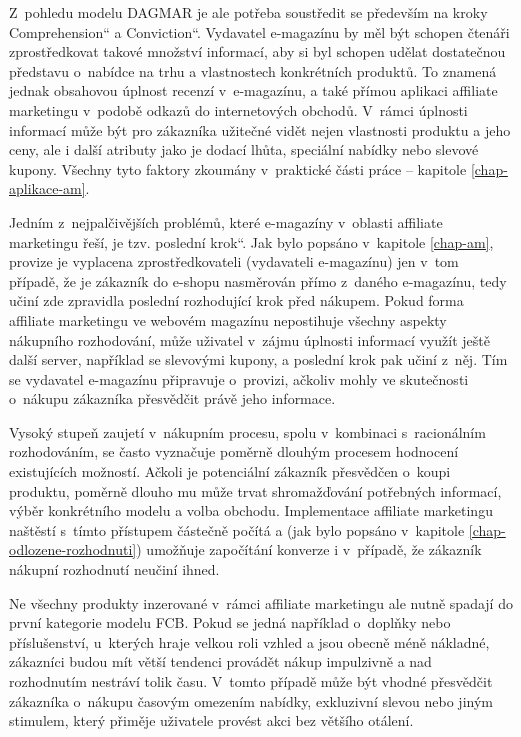 \documentclass[12pt,oneside,openany]{fithesis}
\begin{document}
Z~pohledu modelu DAGMAR je ale potřeba soustředit se především na kroky 
\glqq Comprehension\textquotedblleft{} a \glqq Conviction\textquotedblleft{}. 
Vydavatel e-magazínu by měl být schopen čtenáři zprostředkovat takové 
množství informací, aby si byl schopen udělat dostatečnou představu 
o~nabídce na trhu a vlastnostech konkrétních produktů. To znamená jednak 
obsahovou úplnost recenzí v~e-magazínu, a také přímou aplikaci affiliate 
marketingu v~podobě odkazů do internetových obchodů. V~rámci úplnosti 
informací může být pro zákazníka užitečné vidět nejen vlastnosti 
produktu a jeho ceny, ale i další atributy jako je dodací lhůta, 
speciální nabídky nebo slevové kupony. Všechny tyto faktory zkoumány 
v~praktické části práce -- kapitole 
\hyperlink{chap-aplikace-am}{{\ref{chap-aplikace-am}}}.

Jedním z~nejpalčivějších problémů, které e-magazíny v~oblasti 
affiliate marketingu řeší, je tzv. \glqq poslední krok\textquotedblleft{}. 
Jak bylo popsáno v~kapitole \hyperlink{chap-am}{{\ref{chap-am}}}, provize je 
vyplacena zprostředkovateli (vydavateli e-magazínu) jen v~tom případě, že 
je zákazník do e-shopu nasměrován přímo z~daného e-magazínu, tedy 
učiní zde zpravidla poslední rozhodující krok před nákupem. Pokud forma 
affiliate marketingu ve webovém magazínu nepostihuje všechny aspekty 
nákupního rozhodování, může uživatel v~zájmu úplnosti informací 
využít ještě další server, například se slevovými kupony, a poslední 
krok pak učiní z~něj. Tím se vydavatel e-magazínu připravuje o~provizi, 
ačkoliv mohly ve skutečnosti o~nákupu zákazníka přesvědčit právě jeho 
informace.

Vysoký stupeň zaujetí v~nákupním procesu, spolu v~kombinaci 
s~racionálním rozhodováním, se často vyznačuje poměrně dlouhým 
procesem hodnocení existujících možností. Ačkoli je potenciální 
zákazník přesvědčen o~koupi produktu, poměrně dlouho mu může trvat 
shromažďování potřebných informací, výběr konkrétního modelu a volba 
obchodu. Implementace affiliate marketingu naštěstí s~tímto přístupem 
částečně počítá a (jak bylo popsáno v~kapitole 
\hyperlink{chap-odlozene-rozhodnuti}{{\ref{chap-odlozene-rozhodnuti}}}) 
umožňuje započítání konverze i v~případě, že zákazník nákupní 
rozhodnutí neučiní ihned.

Ne všechny produkty inzerované v~rámci affiliate marketingu ale nutně 
spadají do první kategorie modelu FCB. Pokud se jedná například o~doplňky 
nebo příslušenství, u~kterých hraje velkou roli vzhled a jsou obecně 
méně nákladné, zákazníci budou mít větší tendenci provádět nákup 
impulzivně a nad rozhodnutím nestráví tolik času. V~tomto případě 
může být vhodné přesvědčit zákazníka o~nákupu časovým omezením 
nabídky, exkluzivní slevou nebo jiným stimulem, který přiměje uživatele 
provést akci bez většího otálení.
\end{document}
